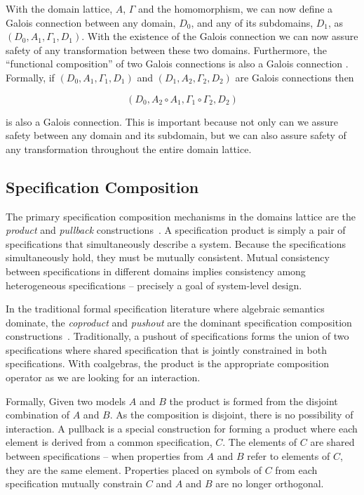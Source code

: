 \documentclass[12pt]{article}
\begin{document}
With the domain lattice, $A$, $\Gamma$ and the homomorphism, we can
now define a Galois connection between any domain, $D_0$, and any of
its subdomains, $D_1$, as $(D_0,A_1,\Gamma_1,D_1)$.  With the
existence of the Galois connection we can now assure safety of any
transformation between these two domains.  Furthermore, the
``functional composition'' of two Galois connections is also a Galois
connection \cite{Nielson:05:Principles-of-P}. Formally, if $(D_0, A_1,
\Gamma_1, D_1)$ and $(D_1, A_2, \Gamma_2,D_2)$ are Galois connections
then

\[(D_0, A_2 \circ A_1, \Gamma_1 \circ \Gamma_2, D_2)\]

\noindent is also a Galois connection.  This is important because not only
can we assure safety between any domain and its subdomain, but we can
also assure safety of any transformation throughout the entire domain
lattice.  

\subsection{Specification Composition}

The primary specification composition mechanisms in the domains
lattice are the \emph{product} and \emph{pullback}
constructions~\cite{Ehrig:85:Fundamentals-of}.  A specification
product is simply a pair of specifications that simultaneously
describe a system.  Because the specifications simultaneously hold,
they must be mutually consistent.  Mutual consistency between
specifications in different domains implies consistency among
heterogeneous specifications -- precisely a goal of system-level
design.

In the traditional formal specification literature where algebraic
semantics dominate, the \emph{coproduct} and \emph{pushout} are the
dominant specification composition
constructions~\cite{Ehrig:85:Fundamentals-of,Smith:93:Constructing-Sp,Smith:90:KIDS:-A-Semiaut}.
Traditionally, a pushout of specifications forms the union of two
specifications where shared specification that is jointly constrained
in both specifications.  With coalgebras, the product is the
appropriate composition operator as we are looking for an interaction.

Formally, Given two models $A$ and $B$ the product is formed from the
disjoint combination of $A$ and $B$. As the composition is disjoint,
there is no possibility of interaction.  A pullback is a special
construction for forming a product where each element is derived from
a common specification, $C$.  The elements of $C$ are shared between
specifications -- when properties from $A$ and $B$ refer to
elements of $C$, they are the same element.  Properties placed on
symbols of $C$ from each specification mutually constrain $C$ and $A$
and $B$ are no longer orthogonal.
\end{document}
